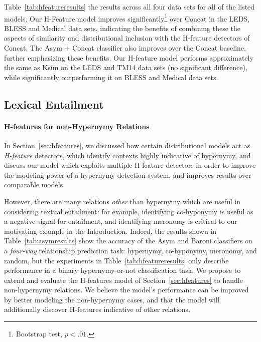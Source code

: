 Table~\ref{tab:hfeatureresults} the results across all four data sets for all
of the listed models. Our H-Feature model improves
significantly\footnote{Bootstrap test, $p<.01$.} over Concat in the LEDS, BLESS
and Medical data sets, indicating the benefits of combining these the aspects
of similarity and distributional inclusion with the H-feature detectors of
Concat.  The Asym + Concat classifier also improves over the Concat baseline,
further emphasizing these benefits. Our H-feature model performs approximately
the same as Ksim on the LEDS and TM14 data sets (no significant difference),
while significantly outperforming it on BLESS and Medical data sets.



\subsection{Lexical Entailment}

\paragraph{H-features for non-Hypernymy Relations}

In Section~\ref{sec:hfeatures}, we discussed how certain distributional models
act as {\em H-feature} detectors, which identify contexts highly indicative
of hypernymy, and discuss our model which exploits
multiple H-feature detectors in order to improve the
modeling power of a hypernymy detection system, and improves results over
comparable models.

However, there are many relations {\em other} than hypernymy which are useful
in considering textual entailment: for example, identifying co-hyponymy is
useful as a negative signal for entailment, and identifying meronomy is
critical to our motivating example in the Introduction.
Indeed, the results shown in Table~\ref{tab:asymresults} show
the accuracy of the Asym and Baroni classifiers on a {\em four-way} relationship
prediction task: hypernymy, co-hyponymy, meronomy, and random, but the
experiments in Table~\ref{tab:hfeatureresults} only describe performance in a
binary hypernymy-or-not classification task. We propose to extend and evaluate
the H-features model of Section~\ref{sec:hfeatures} to handle non-hypernymy
relations. We believe the model's performance can be improved by
better modeling the non-hypernymy cases, and that the model will additionally
discover H-features indicative of other relations.


